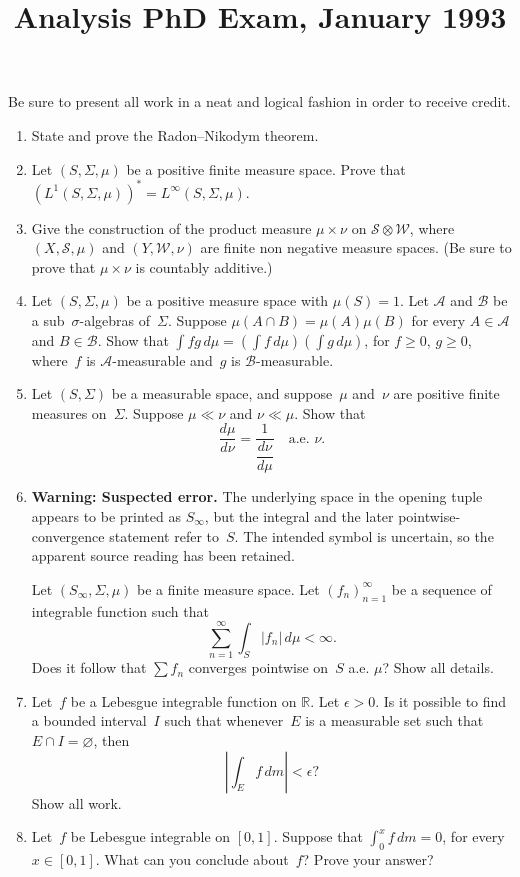 \documentclass[11pt,letterpaper]{article}
\title{Analysis PhD Exam, January 1993}
\author{}
\date{}
\newenvironment{problemconcern}{%
  \par\tagstructbegin{tag=Aside}\begingroup\color{ProblemConcern}
}{%
  \par\endgroup\tagstructend\nopagebreak[4]\vspace{0.12em}
}
\newenvironment{examproblems}[2]{%
  \def\ProblemHeadingTag{#2}%
  \AssignTaggingSocketPlug{block/list/label}{examproblem}%
  \begin{enumerate}%
  \setcounter{enumi}{#1}%
  \renewcommand{\labelenumi}{\textbf{\theenumi.}}%
  \setlength{\topsep}{0.35em}%
  \setlength{\partopsep}{0pt}%
  \setlength{\itemsep}{0.48em}%
  \setlength{\parsep}{0.18em}%
}{\end{enumerate}}
\newenvironment{examinstructions}{%
  \par\begingroup\itshape
}{%
  \par\endgroup\vspace{0.18em}
}
\begin{document}
\maketitle
\thispagestyle{empty}
\begin{examinstructions}
Be sure to present all work in a neat and logical fashion in order to receive credit.
\end{examinstructions}
\begin{examproblems}{0}{H2}
\def\ProblemHeadingText{Problem 1.}
\item
State and prove the Radon–Nikodym theorem.
\def\ProblemHeadingText{Problem 2.}
\item
Let \((S,\Sigma,\mu)\) be a positive finite measure space. Prove that \(\left(L^1(S,\Sigma,\mu)\right)^*=L^\infty(S,\Sigma,\mu)\).
\def\ProblemHeadingText{Problem 3.}
\item
Give the construction of the product measure \(\mu\times\nu\) on \(\mathcal S\otimes\mathcal W\), where \((X,\mathcal S,\mu)\) and \((Y,\mathcal W,\nu)\) are finite non negative measure spaces. (Be sure to prove that \(\mu\times\nu\) is countably additive.)
\def\ProblemHeadingText{Problem 4.}
\item
Let \((S,\Sigma,\mu)\) be a positive measure space with \(\mu(S)=1\). Let \(\mathcal A\) and \(\mathcal B\) be a sub~\(\sigma\)-algebras of~\(\Sigma\). Suppose \(\mu(A\cap B)=\mu(A)\mu(B)\) for every \(A\in\mathcal A\) and \(B\in\mathcal B\). Show that \(\int fg\,d\mu=(\int f\,d\mu)(\int g\,d\mu)\), for \(f\geq 0\), \(g\geq 0\), where~\(f\) is \(\mathcal A\)-measurable and~\(g\) is \(\mathcal B\)-measurable.
\def\ProblemHeadingText{Problem 5.}
\item
Let \((S,\Sigma)\) be a measurable space, and suppose~\(\mu\) and~\(\nu\) are positive finite measures on~\(\Sigma\). Suppose \(\mu\ll\nu\) and \(\nu\ll\mu\). Show that
\[
\frac{d\mu}{d\nu}=\frac{1}{\dfrac{d\nu}{d\mu}}\quad\text{a.e. }\nu.
\]
\def\ProblemHeadingText{Problem 6.}
\item
\begin{problemconcern}
\textbf{Warning: Suspected error.} The underlying space in the opening tuple appears to be printed as \(S_\infty\), but the integral and the later pointwise-convergence statement refer to~\(S\). The intended symbol is uncertain, so the apparent source reading has been retained.
\end{problemconcern}
Let \((S_\infty,\Sigma,\mu)\) be a finite measure space. Let \((f_n)_{n=1}^\infty\) be a sequence of integrable function such that
\[
\sum_{n=1}^\infty\int_S |f_n|\,d\mu<\infty.
\]
 Does it follow that \(\sum f_n\) converges pointwise on~\(S\) a.e. \(\mu\)? Show all details.
\def\ProblemHeadingText{Problem 7.}
\item
Let~\(f\) be a Lebesgue integrable function on \(\mathbb R\). Let \(\epsilon>0\). Is it possible to find a bounded interval~\(I\) such that whenever~\(E\) is a measurable set such that \(E\cap I=\varnothing\), then
\[
\left|\int_E f\,dm\right|<\epsilon?
\]
 Show all work.
\def\ProblemHeadingText{Problem 8.}
\item
Let~\(f\) be Lebesgue integrable on \([0,1]\). Suppose that \(\int_0^x f\,dm=0\), for every \(x\in[0,1]\). What can you conclude about~\(f\)? Prove your answer?
\end{examproblems}
\end{document}
